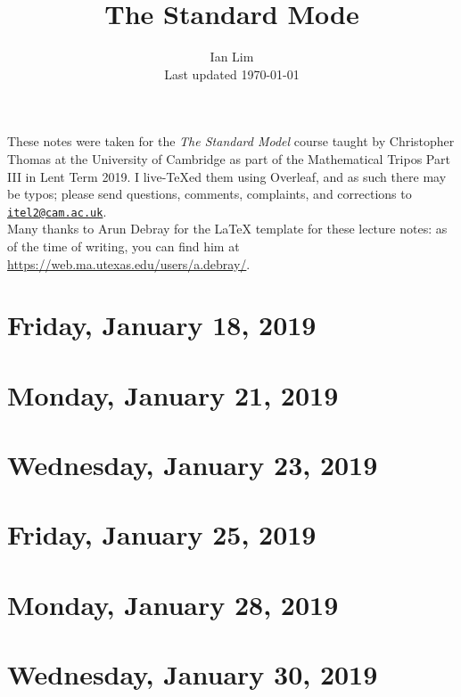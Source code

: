 \documentclass[reqno]{amsart}
\begin{document}
\title{The Standard Mode}
\author{Ian Lim\\ Last updated \today}
\maketitle
{\small\noindent These notes were taken for the \textit{The Standard Model} course taught by Christopher Thomas at the University of Cambridge as part of the Mathematical Tripos Part III in Lent Term 2019. I live-\TeX ed them using Overleaf, and as such there may be typos; please send questions, comments, complaints, and corrections to 
\href{mailto:itel2@cam.ac.uk?subject=SM\%20Lecture\%20Notes}{\texttt{itel2@cam.ac.uk}}.\\
Many thanks to Arun Debray for the {\LaTeX} template for these lecture notes: as of the time of writing, you can find him at \url{https://web.ma.utexas.edu/users/a.debray/}.}

\tableofcontents

\section{Friday, January 18, 2019}
	

\section{Monday, January 21, 2019}
    

\section{Wednesday, January 23, 2019}
    

\section{Friday, January 25, 2019}
    

\section{Monday, January 28, 2019}
    
    
\section{Wednesday, January 30, 2019}
    
\end{document}
